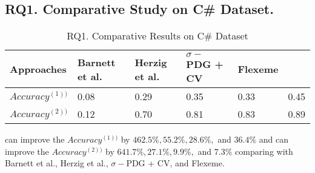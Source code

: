 \subsection{{\bf RQ1. Comparative Study on C\# Dataset.}}

\begin{table}[t]
	\caption{RQ1. Comparative Results on C\# Dataset}
	\vspace{-0.1in}
	\begin{center}
		\footnotesize
		\tabcolsep 4pt
		\renewcommand{\arraystretch}{1} \begin{tabular}{p{1.4cm}<{\centering}|p{1.3cm}<{\centering}p{1.2cm}<{\centering}p{1.4cm}<{\centering}p{0.8cm}<{\centering}|p{0.7cm}<{\centering}}
			
			\hline
			Approaches          & Barnett et al. & Herzig et al. & $\sigma-$PDG + CV& Flexeme & \tool\\
			\hline
			$Accuracy^{(1))}$   &        0.08    &		0.29	&		0.35      & 0.33	& 0.45     \\
			$Accuracy^{(2))}$   &        0.12    &		0.70	&		0.81	  & 0.83    & 0.89      \\
			\hline
		\end{tabular}
		\label{RQ1-result}
	\end{center}
\end{table}

\tool can improve the $Accuracy^{(1))}$ by $462.5\%, 55.2\%, 28.6\%, $ and $36.4\%$ and can improve the  $Accuracy^{(2))}$ by $641.7\%, 27.1\%, 9.9\%, $ and $7.3\%$ comparing with Barnett et al., Herzig et al., $\sigma-$PDG + CV, and Flexeme.